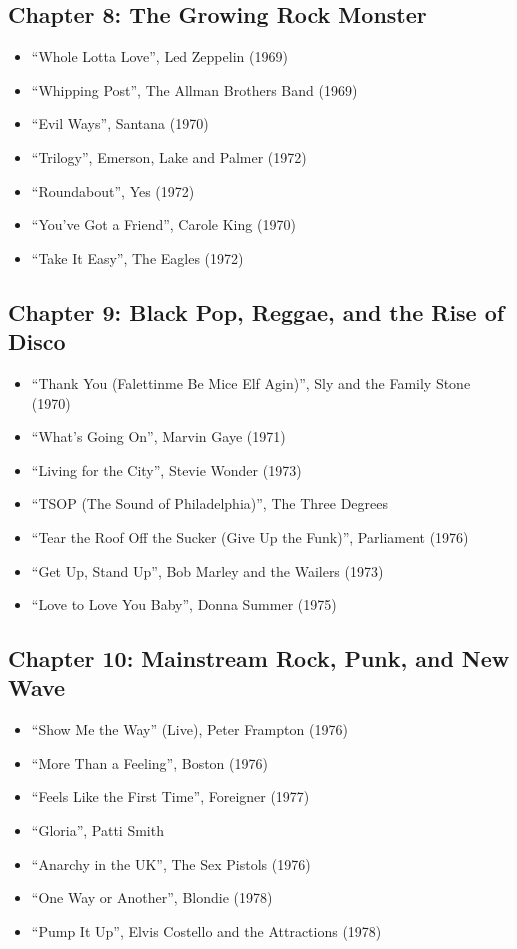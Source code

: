 \documentclass[12pt, a4paper]{book}
\begin{document}
\subsection*{Chapter 8: The Growing Rock Monster}
\begin{itemize}
    \item ``Whole Lotta Love'', Led Zeppelin (1969)
    \item ``Whipping Post'', The Allman Brothers Band (1969)
    \item ``Evil Ways'', Santana (1970)
    \item ``Trilogy'', Emerson, Lake and Palmer (1972)
    \item ``Roundabout'', Yes (1972)
    \item ``You've Got a Friend'', Carole King (1970)
    \item ``Take It Easy'', The Eagles (1972)
\end{itemize}

\subsection*{Chapter 9: Black Pop, Reggae, and the Rise of Disco}
\begin{itemize}
    \item ``Thank You (Falettinme Be Mice Elf Agin)'', Sly and the Family Stone (1970)
    \item ``What's Going On'', Marvin Gaye (1971)
    \item ``Living for the City'', Stevie Wonder (1973)
    \item ``TSOP (The Sound of Philadelphia)'', The Three Degrees
    \item ``Tear the Roof Off the Sucker (Give Up the Funk)'', Parliament (1976)
    \item ``Get Up, Stand Up'', Bob Marley and the Wailers (1973)
    \item ``Love to Love You Baby'', Donna Summer (1975)
\end{itemize}

\subsection*{Chapter 10: Mainstream Rock, Punk, and New Wave}
\begin{itemize}
    \item ``Show Me the Way'' (Live), Peter Frampton (1976)
    \item ``More Than a Feeling'', Boston (1976)
    \item ``Feels Like the First Time'', Foreigner (1977)
    \item ``Gloria'', Patti Smith
    \item ``Anarchy in the UK'', The Sex Pistols (1976)
    \item ``One Way or Another'', Blondie (1978)
    \item ``Pump It Up'', Elvis Costello and the Attractions (1978)
\end{itemize}
\end{document}
